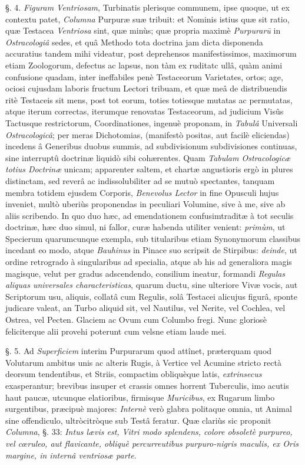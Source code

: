 \documentclass[a4paper, 11pt, oneside, polutonikogreek, german]{article}
\begin{document}
§. 4. \emph{Figuram Ventriosam}, Turbinatis plerisque communem, ipse quoque, ut ex contextu patet, \emph{Columna} Purpuræ suæ tribuit: et Nominis istius quæ sit ratio, quæ Testacea \emph{Ventriosa} sint, quæ minùs; quæ propria maximè \emph{Purpurarū} in \emph{Ostracologiâ} sedes, et quâ Methodo tota doctrina jam dicta disponenda accuratius tandem mihi videatur, post deprehensos manifestissimos, maximorum etiam Zoologorum, defectus ac lapsus, non tàm ex ruditatc ullâ, quàm animi confusione quadam, inter ineffabiles penè Testaceorum Varietates, ortos; age, ociosi cujusdam laboris fructum Lectori tribuam, et quæ meâ de distribuendis ritè Testaceis sit mens, post tot eorum, toties totiesque mutatas ac permutatas, atque iterum correctas, iterumque renovatas Testaceorum, ad judicium Visûs Tactusque restrictorum, Coordinationes, ingenuè proponam, in \emph{Tabulâ} Universali \emph{Ostracologicâ}; per meras Dichotomias, (manifestò positas, aut facilè eliciendas) incedens â Generibus duobus summis, ad subdivisionum subdivisiones continuas, sine interruptû doctrinæ liquidò sibi cohærentes. Quam \emph{Tabulam Ostracologicæ totius Doctrinæ} unicam; apparenter saltem, et chartæ angustioris ergò in plures distinctam, sed reverâ ac indissolubiliter ad se mutuò spectantes, tanquam membra totidem ejusdem Corporis, \emph{Benevolus Lector} in fine Opusculi hujus inveniet, multò uberiùs proponendas in peculiari Volumine, sive à me, sive ab aliis scribendo. In quo duo hæc, ad emendationem confusimtraditæ à tot seculis doctrinæ, hæc duo simul, ni fallor, curæ habenda utiliter venient: \emph{primùm}, ut Specierum quarumcunque exempla, sub titularibus etiam Synonymorum classibus incedant eo modo, atque \emph{Bauhinus} in Pinace suo scripsit de Stirpibus: \emph{deinde}, ut ordine retrogrado à singularibus ad specialia, atque ab his ad generaliora magis magisque, velut per gradus adscendendo, consilium ineatur, formandi \emph{Regulas aliquas universales characteristicas}, quarum ductu, sine ulteriore Vivæ vocis, aut Scriptorum usu, aliquis, collatâ cum Regulis, solâ Testacei alicujus figurâ, sponte judicare valeat, an Turbo aliquid sit, vel Nautilus, vel Nerite, vel Cochlea, vel Ostrea, vel Pecten. Glaciem ac Ovum cum Columbo fregi. Nunc gloriosè feliciterque alii provehi poterunt cum velsne etiam laude mei.

§. 5. Ad \emph{Superficiem} interim Purpurarum quod attînet, præterquam quod Volutarum ambitus unis ac alteris Rugis, à Vertice vel Acumine stricto rectà deorsum tendentibus, et Striis, compactim obliquèque latis, \emph{extrinsecus} exasperantur; brevibus insuper et crassis omnes horrent Tuberculis, imo acutis haut paucæ, utcunque elatioribus, firmisque \emph{Muricibus}, ex Rugarum limbo surgentibus, præcipuè majores: \emph{Internè} verò glabra politaque omnia, ut Animal sine offendiculo, ultròcitròque sub Testâ feratur. Quæ clariùs sic proponit \emph{Columna}, §. 33: \emph{Intus lævis est, Vitri modo splendens, colore obsoletè purpureo, vel cœruleo, aut flavicante, obliquè percurreutibus purpuro-nigris maculis, ex Oris margine, in internâ ventriosæ parte}.
\end{document}
